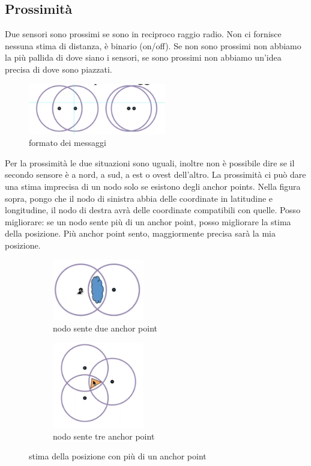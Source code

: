 \documentclass[12pt,italian]{report}
\begin{document}
\subsection{Prossimità}
Due sensori sono prossimi se sono in reciproco raggio radio. Non ci fornisce nessuna stima di distanza, è binario (on/off). Se non sono prossimi non abbiamo la più pallida di dove siano i sensori, se sono prossimi non abbiamo un'idea precisa di dove sono piazzati. 
\begin{figure}[h]
\centering
\includegraphics[width=60mm]{img/prox.PNG}
\caption{formato dei messaggi}
\label{fig:form}
\end{figure}
Per la prossimità le due situazioni sono uguali, inoltre non è possibile dire se il secondo sensore è a nord, a sud, a est o ovest dell'altro. 
\bigbreak
La prossimità ci può dare una stima imprecisa di un nodo solo se esistono degli anchor points. Nella figura sopra, pongo che il nodo di sinistra abbia delle coordinate in latitudine e longitudine, il nodo di destra avrà delle coordinate compatibili con quelle. 
\bigbreak
Posso migliorare: se un nodo sente più di un anchor point, posso migliorare la stima della posizione. Più anchor point sento, maggiormente precisa sarà la mia posizione. 
\begin{figure}[h]
     \centering
     \begin{subfigure}[b]{0.3\textwidth}
         \centering
         \includegraphics[width=40mm]{img/prox2.PNG}
         \caption{nodo sente due anchor point}
     \end{subfigure}
     \hfill
     \begin{subfigure}[b]{0.3\textwidth}
         \centering
          \includegraphics[width=40mm]{img/prox3.PNG}
          \caption{nodo sente tre anchor point}
     \end{subfigure}
    \caption{stima della posizione con più di un anchor point}
    \label{fig:ancopoin}
\end{figure}
\end{document}
